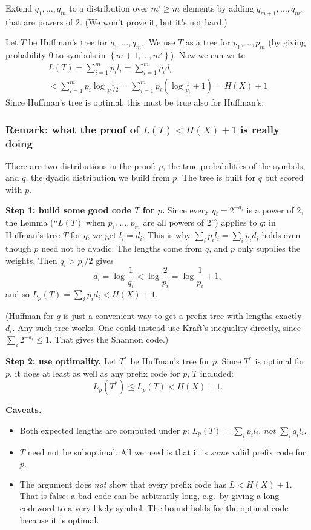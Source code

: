 \documentclass{article}
\begin{document}
Extend $q_1,\ldots,q_m$ to a distribution over $m'\geq m$ elements by adding $q_{m+1},\ldots,q_{m'}$ that are powers of 2. (We won't prove it, but it's not hard.)

Let $T$ be Huffman's tree for $q_1,\ldots,q_{m'}$. We use $T$ as a tree for $p_1,\ldots,p_m$ (by giving probability $0$ to symbols in $\left\{m+1,\ldots,m'\right\}$). Now we can write 
\begin{gather*}
    L(T) = \sum_{i=1 }^{m }p_i l_i = \sum_{i=1 }^{m }p_i d_i \\
    < \sum_{i=1 }^{m }p_i \log \frac{1 }{p_i/2 }= \sum_{i=1 }^{m }p_i \left(\log \frac{1 }{p_i }+ 1 \right)= H(X) + 1
\end{gather*}
Since Huffman's tree is optimal, this must be true also for Huffman's.

\subsubsection{Remark: what the proof of $L(T) < H(X)+1$ is really doing}

There are two distributions in the proof: $p$, the true probabilities of the symbols, and $q$, the dyadic distribution we build from $p$. The tree is built for $q$ but scored with $p$.

\textbf{Step 1: build some good code $T$ for $p$.} Since every $q_i = 2^{-d_i}$ is a power of 2, the Lemma (``$L(T)$ when $p_1,\ldots,p_m$ are all powers of 2'') applies to $q$: in Huffman's tree $T$ for $q$, we get $l_i = d_i$. This is why $\sum_i p_i l_i = \sum_i p_i d_i$ holds even though $p$ need not be dyadic. The lengths come from $q$, and $p$ only supplies the weights. Then $q_i > p_i/2$ gives
\[
d_i = \log\frac{1}{q_i} < \log\frac{2}{p_i} = \log\frac{1}{p_i} + 1,
\]
and so $L_p(T) = \sum_i p_i d_i < H(X) + 1$.

(Huffman for $q$ is just a convenient way to get a prefix tree with lengths exactly $d_i$. Any such tree works. One could instead use Kraft's inequality directly, since $\sum_i 2^{-d_i} \leq 1$. That gives the Shannon code.)

\textbf{Step 2: use optimality.} Let $T^*$ be Huffman's tree for $p$. Since $T^*$ is optimal for $p$, it does at least as well as any prefix code for $p$, $T$ included:
\[
L_p(T^*) \leq L_p(T) < H(X) + 1.
\]

\textbf{Caveats.}
\begin{itemize}
    \item Both expected lengths are computed under $p$: $L_p(T) = \sum_i p_i l_i$, \emph{not} $\sum_i q_i l_i$.
    \item $T$ need not be suboptimal. All we need is that it is \emph{some} valid prefix code for $p$.
    \item The argument does \emph{not} show that every prefix code has $L < H(X)+1$. That is false: a bad code can be arbitrarily long, e.g.\ by giving a long codeword to a very likely symbol. The bound holds for the optimal code because it is optimal.
\end{itemize}
\end{document}
